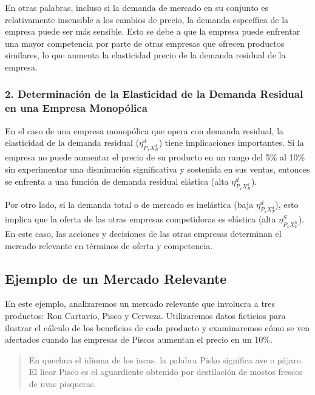\documentclass[
  letterpaper,
  DIV=11,
  numbers=noendperiod]{scrartcl}
\begin{document}
En otras palabras, incluso si la demanda de mercado en su conjunto es
relativamente insensible a los cambios de precio, la demanda específica
de la empresa puede ser más sensible. Esto se debe a que la empresa
puede enfrentar una mayor competencia por parte de otras empresas que
ofrecen productos similares, lo que aumenta la elasticidad precio de la
demanda residual de la empresa.

\hypertarget{determinaciuxf3n-de-la-elasticidad-de-la-demanda-residual-en-una-empresa-monopuxf3lica}{%
\subsubsection{2. Determinación de la Elasticidad de la Demanda Residual
en una Empresa
Monopólica}\label{determinaciuxf3n-de-la-elasticidad-de-la-demanda-residual-en-una-empresa-monopuxf3lica}}

En el caso de una empresa monopólica que opera con demanda residual, la
elasticidad de la demanda residual (\(\eta_{P_{x}X_R^d}^d\)) tiene
implicaciones importantes. Si la empresa no puede aumentar el precio de
su producto en un rango del 5\% al 10\% sin experimentar una disminución
significativa y sostenida en sus ventas, entonces se enfrenta a una
función de demanda residual elástica (alta \(\eta_{P_{x}X_R^d}^d\)).

Por otro lado, si la demanda total o de mercado es inelástica (baja
\(\eta_{P_{x}X_T^d}^d\)), esto implica que la oferta de las otras
empresas competidoras es elástica (alta \(\eta_{P_{x}X_C^S}^S\)). En
este caso, las acciones y decisiones de las otras empresas determinan el
mercado relevante en términos de oferta y competencia.

\hypertarget{ejemplo-de-un-mercado-relevante}{%
\subsection{Ejemplo de un Mercado
Relevante}\label{ejemplo-de-un-mercado-relevante}}

En este ejemplo, analizaremos un mercado relevante que involucra a tres
productos: Ron Cartavio, Pisco y Cerveza. Utilizaremos datos ficticios
para ilustrar el cálculo de los beneficios de cada producto y
examinaremos cómo se ven afectados cuando las empresas de Piscos
aumentan el precio en un 10\%.

\begin{quote}
En quechua el idioma de los incas. la palabra Pisko significa ave o
pájaro. El licor Pisco es el aguardiente obtenido por destilación de
mostos frescos de uvas pisqueras.
\end{quote}
\end{document}
